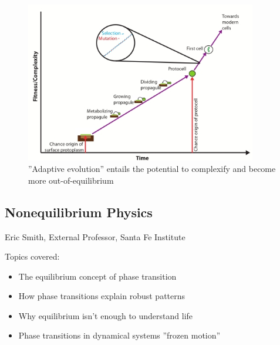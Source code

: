 \documentclass[]{article}
\begin{document}
\begin{figure}[H]
	\caption{''Adaptive evolution'' entails the potential to complexify and become more out-of-equilibrium}\label{fig:AdaptiveEvolution} 
	\includegraphics[width=0.9\textwidth]{AdaptiveEvolution}
\end{figure}

\subsection{Nonequilibrium Physics}

 Eric Smith, External Professor, Santa Fe Institute


Topics covered:
\begin{itemize}
	\item The equilibrium concept of phase transition
	
	\item How phase transitions explain robust patterns
	
	\item Why equilibrium isn’t enough to understand life
	\item Phase transitions in dynamical systems ''frozen motion''
\end{itemize}
\end{document}
